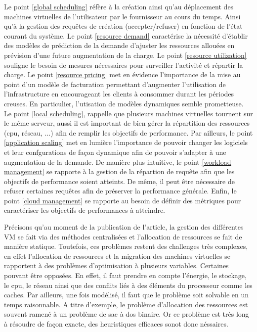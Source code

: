 \documentclass[11pt]{article}
\begin{document}
Le point \ref{global scheduling} réfère à la création ainsi qu'au déplacement des machines virtuelles de l'utilisateur par le fournisseur au cours du temps.
Ainsi qu'à la gestion des requêtes de création (accepter/refuser) en fonction de l'état courant du système. Le point \ref{resource demand} caractérise la 
nécessité d'établir des modèles de prédiction de la demande d'ajuster les ressources allouées en prévision d'une future augmentation de la charge. Le point 
\ref{resource utilization} souligne le besoin de mesures nécessaires pour surveiller l'activité et répartir la charge. Le point \ref{resource pricing} met en évidence 
l'importance de la mise au point d'un modèle de facturation permettant d'augmenter l'utilisation de l'infrastructure en encourageant les clients à consommer durant les
périodes creuses. En particulier, l'utisation de modèles dynamiques semble prometteuse. Le point \ref{local scheduling}, rappelle que plusieurs machines virtuelles 
tournent sur le même serveur, aussi il est important de bien gérer la répartition des ressources (cpu, réseau, ...) afin de remplir les objectifs de performance. Par
ailleurs, le point \ref{application scaling} met en lumière l'importance de pouvoir changer les logiciels et leur confgurations de façon dynamique afin de pouvoir s'adapter
à une augmentation de la demande. De manière plus intuitive, le point \ref{workload management} se rapporte à la gestion de la répartion de requête afin que les objectifs
de performance soient atteints. De même, il peut être nécessaire de refuser certaines requêtes afin de préserver la performance générale. Enfin, le point 
\ref{cloud management} se rapporte au besoin de définir des métriques pour caractériser les objectifs de performances à atteindre.

Précisons qu'au moment de la publication de l'article, la gestion des différentes VM se fait via des méthodes centralisées et l'allocation de ressources se fait de 
manière statique. Toutefois, ces problèmes restent des challenges très complexes, en effet l'allocation de ressources et la migration des machines virtuelles se rapportent
à des problèmes d'optimisation à plusieurs variables. Certaines pouvant être opposées. En effet, il faut prendre en compte l'énergie, le stockage, le cpu, le réseau 
ainsi que des conflits liés à des éléments du processeur comme les caches. Par ailleurs, une fois modélisé, il faut que le problème soit solvable en un temps raisonnable.
A titre d'exemple, le problème d'allocation des ressources est souvent ramené à un problème de sac à dos binaire. Or ce problème est très long à résoudre de façon exacte, 
des heuristiques efficaces sonot donc néssaires.
\end{document}
